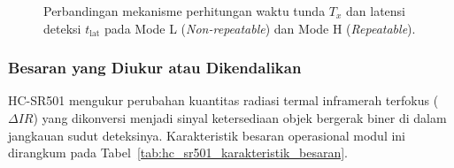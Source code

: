\begin{figure}[htbp]
    \caption{Perbandingan mekanisme perhitungan waktu tunda $T_x$ dan latensi deteksi $t_{\text{lat}}$ pada Mode L (\textit{Non-repeatable}) dan Mode H (\textit{Repeatable}).}
    \label{fig:hc_sr501_timing_combined}
\end{figure}


\subsubsection{Besaran yang Diukur atau Dikendalikan}
HC-SR501 mengukur perubahan kuantitas radiasi termal inframerah terfokus ($\Delta IR$) yang dikonversi menjadi sinyal ketersediaan objek bergerak biner di dalam jangkauan sudut deteksinya. Karakteristik besaran operasional modul ini dirangkum pada Tabel~\ref{tab:hc_sr501_karakteristik_besaran}.

